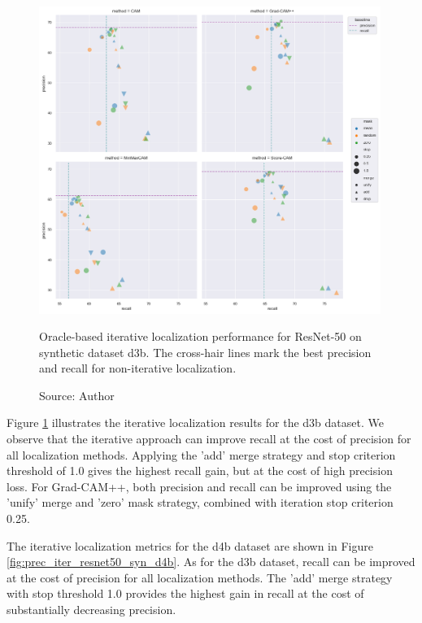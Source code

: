 \begin{figure}[h]
    \begin{center}       
    \includegraphics[width=0.99\textwidth]{images/fig_iter_resnet50_syn_d3b.png}
    \caption[Oracle-based iterative localization performance for ResNet-50 on synthetic dataset d3b]{Oracle-based iterative localization performance for ResNet-50 on synthetic dataset d3b. The cross-hair lines mark the best precision and recall for non-iterative localization.}
    \caption*{Source: Author}
    \label{fig:prec_iter_resnet50_syn_d3b}
    \end{center}
\end{figure}

Figure \ref{fig:prec_iter_resnet50_syn_d3b} illustrates the iterative localization results for the d3b dataset. We observe that the iterative approach can improve recall at the cost of precision for all localization methods. Applying the 'add' merge strategy and stop criterion threshold of 1.0 gives the highest recall gain, but at the cost of high precision loss. For Grad-CAM++, both precision and recall can be improved using the 'unify' merge and 'zero' mask strategy, combined with iteration stop criterion 0.25.

The iterative localization metrics for the d4b dataset are shown in Figure \ref{fig:prec_iter_resnet50_syn_d4b}. As for the d3b dataset, recall can be improved at the cost of precision for all localization methods. The 'add' merge strategy with stop threshold 1.0 provides the highest gain in recall at the cost of substantially decreasing precision.

